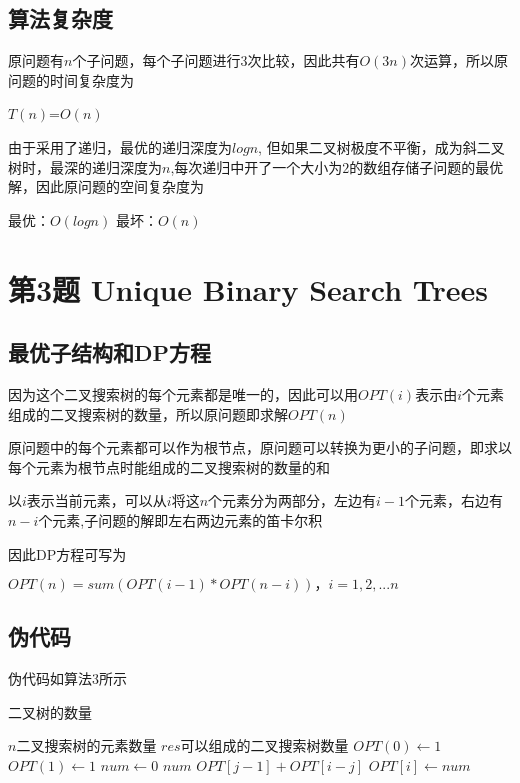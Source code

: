 \documentclass{article}
\begin{document}
\subsection{算法复杂度}
原问题有$n$个子问题，每个子问题进行$3$次比较，因此共有$O(3n)$次运算，所以原问题的时间复杂度为
\begin{center}
    $T(n)$=$O(n)$ 
\end{center} 
\par 由于采用了递归，最优的递归深度为$logn$, 但如果二叉树极度不平衡，成为斜二叉树时，最深的递归深度为$n$,每次递归中开了一个大小为$2$的数组存储子问题的最优解，因此原问题的空间复杂度为
\begin{center}
    最优：$O(logn)$
    最坏：$O(n)$
\end{center} 

\newpage
\section{第3题 Unique Binary Search Trees}
\subsection{最优子结构和DP方程}
因为这个二叉搜索树的每个元素都是唯一的，因此可以用$OPT(i)$表示由$i$个元素组成的二叉搜索树的数量，所以原问题即求解$OPT(n)$
\par 原问题中的每个元素都可以作为根节点，原问题可以转换为更小的子问题，即求以每个元素为根节点时能组成的二叉搜索树的数量的和
\par 以$i$表示当前元素，可以从$i$将这$n$个元素分为两部分，左边有$i-1$个元素，右边有$n-i$个元素,子问题的解即左右两边元素的笛卡尔积
\par 因此DP方程可写为
\begin{center}
    $OPT(n) = sum(OPT(i-1) * OPT(n-i))，i=1,2,...n$
\end{center}

\subsection{伪代码}
\par 伪代码如算法3所示

\begin{CJK*}{UTF8}{gkai}
    \begin{algorithm}
        \caption{二叉树的数量}
        \begin{algorithmic}[1] %
            \Require $n$二叉搜索树的元素数量
            \Ensure $res$可以组成的二叉搜索树数量
                \State $OPT(0) \gets 1$
                \State $OPT(1) \gets 1$
                    \State {}
                \EndIf
                    \State $num \gets 0$
                        \State $num$ \gets $OPT[j-1] + OPT[i-j]$
                    \EndFor
                    $OPT[i] \gets num$
                \EndFor
                \State {}
            \EndFunction
        \end{algorithmic}
    \end{algorithm}
\end{CJK*}
\end{document}
